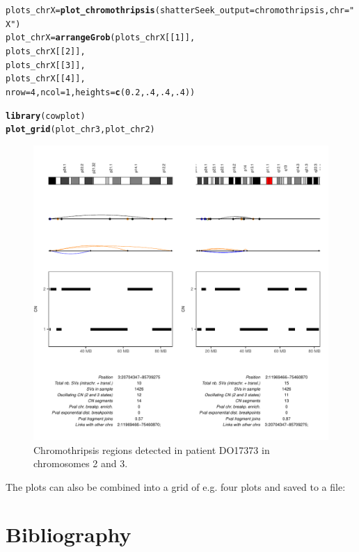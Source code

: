 \documentclass[twoside,a4wide,11pt]{article}\usepackage[]{graphicx}\usepackage[]{color}
\makeatletter
\newcommand{\hlnum}[1]{\textcolor[rgb]{0.686,0.059,0.569}{#1}}%
\newcommand{\hlstr}[1]{\textcolor[rgb]{0.192,0.494,0.8}{#1}}%
\newcommand{\hlstd}[1]{\textcolor[rgb]{0.345,0.345,0.345}{#1}}%
\newcommand{\hlkwb}[1]{\textcolor[rgb]{0.69,0.353,0.396}{#1}}%
\newcommand{\hlkwc}[1]{\textcolor[rgb]{0.333,0.667,0.333}{#1}}%
\newcommand{\hlkwd}[1]{\textcolor[rgb]{0.737,0.353,0.396}{\textbf{#1}}}%
\newenvironment{kframe}{%
 \def\at@end@of@kframe{}%
 \ifinner\ifhmode%
  \def\at@end@of@kframe{\end{minipage}}%
  \begin{minipage}{\columnwidth}%
 \fi\fi%
 \def\FrameCommand##1{\hskip\@totalleftmargin \hskip-\fboxsep
 \colorbox{shadecolor}{##1}\hskip-\fboxsep
     \hskip-\linewidth \hskip-\@totalleftmargin \hskip\columnwidth}%
 \MakeFramed {\advance\hsize-\width
   \@totalleftmargin\z@ \linewidth\hsize
   \@setminipage}}%
 {\par\unskip\endMakeFramed%
 \at@end@of@kframe}
\newenvironment{knitrout}{}{} %
\makeatother
\begin{document}
\begin{knitrout}
\begin{kframe}
\begin{alltt}
\hlstd{plots_chrX} \hlkwb{=} \hlkwd{plot_chromothripsis}\hlstd{(}\hlkwc{shatterSeek_output} \hlstd{= chromothripsis,}\hlkwc{chr} \hlstd{=} \hlstr{"X"}\hlstd{)}
\hlstd{plot_chrX} \hlkwb{=} \hlkwd{arrangeGrob}\hlstd{(plots_chrX[[}\hlnum{1}\hlstd{]],}
                        \hlstd{plots_chrX[[}\hlnum{2}\hlstd{]],}
                        \hlstd{plots_chrX[[}\hlnum{3}\hlstd{]],}
                        \hlstd{plots_chrX[[}\hlnum{4}\hlstd{]],}
                         \hlkwc{nrow}\hlstd{=}\hlnum{4}\hlstd{,}\hlkwc{ncol}\hlstd{=}\hlnum{1}\hlstd{,}\hlkwc{heights}\hlstd{=}\hlkwd{c}\hlstd{(}\hlnum{0.2}\hlstd{,}\hlnum{.4}\hlstd{,}\hlnum{.4}\hlstd{,}\hlnum{.4}\hlstd{))}

\hlkwd{library}\hlstd{(cowplot)}
\hlkwd{plot_grid}\hlstd{(plot_chr3,plot_chr2)}
\end{alltt}
\end{kframe}\begin{figure}

{\centering \includegraphics[width=0.85\linewidth,height=0.55\textheight]{figure/unnamed-chunk-11-1} 

}

\caption[Chromothripsis regions detected in patient DO17373 in chromosomes 2 and 3]{Chromothripsis regions detected in patient DO17373 in chromosomes 2 and 3.}\label{fig:unnamed-chunk-11}
\end{figure}


\end{knitrout}

The plots can also be combined into a grid of e.g. four plots and saved to a file:



\section{Bibliography}
\printbibliography
\end{document}
